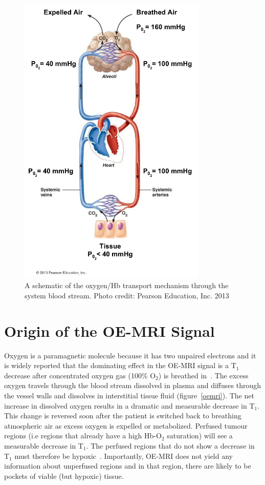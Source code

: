 	\begin{figure}
		\includegraphics[width=0.8\textwidth]{./oemri_thesis1/oemri_thesis1-images/mmHg.png}
		\caption{A schematic of the oxygen/\acs{Hb} transport mechanism through the system blood stream. Photo credit: Pearson Education, Inc. 2013}
		\label{mmhg}
	\end{figure}

\section{Origin of the OE-MRI Signal}

Oxygen is a paramagnetic molecule because it has two unpaired electrons and it is widely reported that the dominating effect in the OE-MRI signal is a T$_1$ decrease after concentrated oxygen gas (100\% O$_2$) is breathed in~\cite{OConnor:2016ee,Linnik:2013hf}. 
The excess oxygen travels through the blood stream dissolved in plasma and diffuses through the vessel walls and dissolves in interstitial tissue fluid (figure~\ref{oemri}).
The net increase in dissolved oxygen results in a dramatic and measurable decrease in T$_1$. 
This change is reversed soon after the patient is switched back to breathing atmospheric air as excess oxygen is expelled or metabolized. 
Perfused tumour regions (i.e regions that already have a high \acs{Hb}-O$_2$ saturation) will see a measurable decrease in T$_1$. 
The perfused regions that do not show a decrease in T$_1$ must therefore be hypoxic~\cite{OConnor:2016ee}. 
Importantly, OE-MRI does not yield any information about unperfused regions and in that region, there are likely to be pockets of viable (but hypoxic) tissue.

